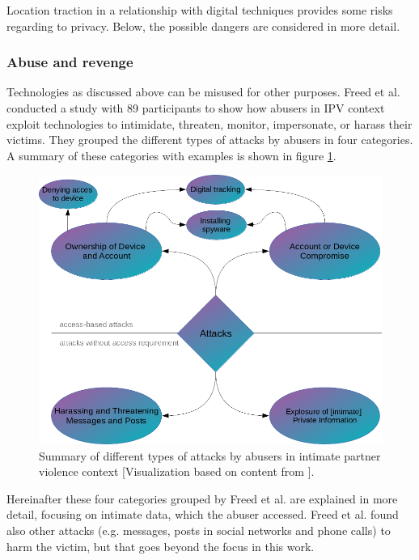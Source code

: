 
Location traction in a relationship with digital techniques provides some risks regarding to privacy. Below, the possible dangers are considered in more detail.

\subsubsection{Abuse and revenge}
Technologies as discussed above can be misused for other purposes. Freed et al. \cite{freed2018stalker} conducted a study with 89 participants to show how abusers in \ac{IPV} context exploit technologies to intimidate, threaten, monitor, impersonate, or harass their victims.
They grouped the different types of attacks by abusers in four categories. A summary of these categories with examples is shown in figure \ref{fig:abusing_categories}.

\begin{figure}[htb]
	\centering
	\includegraphics[width=\linewidth]{img/abusing_categories.png}
	\caption{Summary of different types of attacks by abusers in intimate partner violence context [Visualization based on content from \cite{freed2018stalker}].}
	\label{fig:abusing_categories}
\end{figure}
Hereinafter these four categories grouped by Freed et al. \cite{freed2018stalker} are explained in more detail, focusing on intimate data, which the abuser accessed. Freed et al. found also other attacks (e.g. messages, posts in social networks and phone calls) to harm the victim, but that goes beyond the focus in this work.

